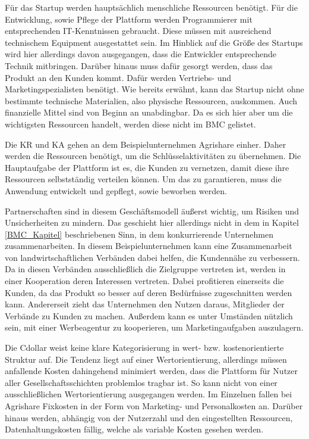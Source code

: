 Für das Startup werden hauptsächlich menschliche Ressourcen benötigt. Für die Entwicklung, sowie Pflege der Plattform werden Programmierer mit entsprechenden IT-Kenntnissen gebraucht. Diese müssen mit ausreichend technischem Equipment ausgestattet sein. Im Hinblick auf die Größe des Startups wird hier allerdings davon ausgegangen, dass die Entwickler entsprechende Technik mitbringen. Darüber hinaus muss dafür gesorgt werden, dass das Produkt an den Kunden kommt. Dafür werden Vertriebs- und Marketingspezialisten benötigt. Wie bereits erwähnt, kann das Startup nicht ohne bestimmte technische Materialien, also physische Ressourcen, auskommen. Auch finanzielle Mittel sind von Beginn an unabdingbar. Da es sich hier aber um die wichtigsten Ressourcen handelt, werden diese nicht im \ac{BMC} gelistet.

Die \ac{KR} und \ac{KA} gehen an dem Beispielunternehmen Agrishare einher. Daher werden die Ressourcen benötigt, um die Schlüsselaktivitäten zu übernehmen. Die Hauptaufgabe der Plattform ist es, die Kunden zu vernetzen, damit diese ihre Ressourcen selbstständig verteilen können. Um das zu garantieren, muss die Anwendung entwickelt und gepflegt, sowie beworben werden. 

Partnerschaften sind in diesem Geschäftsmodell äußerst wichtig, um Risiken und Unsicherheiten zu mindern. Das geschieht hier allerdings nicht in dem in Kapitel \ref{BMC_Kapitel} beschriebenen Sinn, in dem konkurrierende Unternehmen zusammenarbeiten. In diesem Beispielunternehmen kann eine Zusammenarbeit von landwirtschaftlichen Verbänden dabei helfen, die Kundennähe zu verbessern. Da in diesen Verbänden ausschließlich die Zielgruppe vertreten ist, werden in einer Kooperation deren Interessen vertreten. Dabei profitieren einerseits die Kunden, da das Produkt so besser auf deren Bedürfnisse zugeschnitten werden kann. Andererseit zieht das Unternehmen den Nutzen daraus, Mitglieder der Verbände zu Kunden zu machen. Außerdem kann es unter Umständen nützlich sein, mit einer Werbeagentur zu kooperieren, um Marketingaufgaben auszulagern. 

Die \ac{Cdollar} weist keine klare Kategorisierung in wert- bzw. kostenorientierte Struktur auf. Die Tendenz liegt auf einer Wertorientierung, allerdings müssen anfallende Kosten dahingehend minimiert werden, dass die Plattform für Nutzer aller Gesellschaftsschichten problemlos tragbar ist. So kann nicht von einer ausschließlichen Wertorientierung ausgegangen werden. Im Einzelnen fallen bei Agrishare Fixkosten in der Form von Marketing- und Personalkosten an. Darüber hinaus werden, abhängig von der Nutzerzahl und den eingestellten Ressourcen, Datenhaltungskosten fällig, welche als variable Kosten gesehen werden.